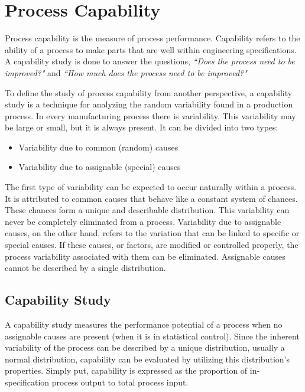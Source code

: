 \documentclass[11pt]{article} %
\begin{document}
\tableofcontents
\newpage
\section{Process Capability}
Process capability is the measure of process performance. Capability refers to the ability of a process to make parts that are well within engineering specifications. A capability study is done to answer the questions, \textit{``Does the process need to be improved?"} and  \textit{``How much does the process need to be improved?"}

To define the study of process capability from another perspective, a capability study is a technique for analyzing the random variability found in a production process. In every manufacturing process there is variability. This variability may be large or small, but it is always present. It can be divided into two types:

\begin{itemize}
\item Variability due to common (random) causes
\item Variability due to assignable (special) causes
\end{itemize}
The first type of variability can be expected to occur naturally within a process. It is attributed to common causes that behave like a constant system of chances. These chances form a unique and describable distribution. This variability can never be completely eliminated from a process. Variability due to assignable causes, on the other hand, refers to the variation that can be linked to specific or special causes. If these causes, or factors, are modified or controlled properly, the process variability associated with them can be eliminated. Assignable causes cannot be described by a single distribution.
\subsection{Capability Study} 
A capability study measures the performance potential of a process when no assignable causes are present (when it is in statistical control). Since the inherent variability of the process can be described by a unique distribution, usually a normal distribution, capability can be evaluated by utilizing this distribution’s properties. Simply put, capability is expressed as the proportion of in-specification process output to total process input.
\end{document}
